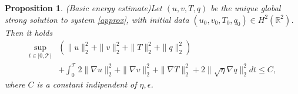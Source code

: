 \documentclass[11pt, a4paper, article,reqno,]{amsart}
\newtheorem{proposition}[theorem]{Proposition}
\theoremstyle{remark}
\numberwithin{equation}{section}
\begin{document}
\begin{proposition}(Basic energy estimate)\label{1ene}
 Let $(u,v,T,q)$ be the unique global strong solution to system \eqref{approx}, with initial data $(u_0,v_0,T_{0},q_0) \in H^2(\mathbb{R}^2)$. Then it holds
\begin{equation}\label{energy_approx}
    \begin{aligned}
        \sup_{t \in [0, \mathcal{T})} & \left(\|u\|_2^2 + \|v\|_2^2 +  \|T\|_2^2 + \|q\|_2^2 \right)  \\
        & + \int_0^{\mathcal{T}} 2\|\nabla u\|_2^2 + \|\nabla v\|_2^2 + \|\nabla T\|_2^2 + 2\|\sqrt{\eta} \nabla q\|_2^2 dt \leq C, 
    \end{aligned}
\end{equation}
where $C$ is a constant indipendent of $\eta, \epsilon$.
\end{proposition}
\end{document}
